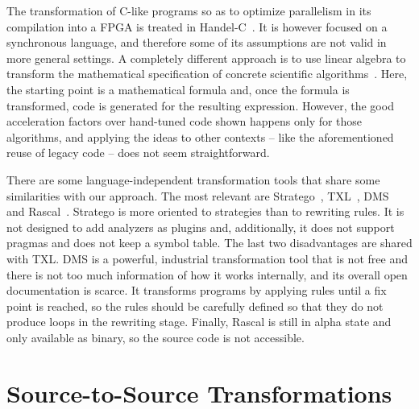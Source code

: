 \documentclass[svgnames,usenames,preprint,nocopyrightspace]{sigplanconf}
\begin{document}
The transformation of C-like programs so as to optimize parallelism in
its compilation into a FPGA is treated in
Handel-C~\cite{Brown2005-tr-opt_trans_hw}.  It is however focused on a
synchronous language, and therefore some of its assumptions are not
valid in more general settings.
A completely different approach is to use linear algebra to transform the
mathematical specification of concrete scientific
algorithms~\cite{Franchetti2006,Fabregat2013,DiNapoli2014}.
Here, the starting point is a mathematical formula and, once the formula is
transformed, code is generated for the resulting expression. 
However, the good acceleration factors over hand-tuned code shown
happens only for those algorithms, and applying the ideas to
other contexts -- like the aforementioned reuse of legacy code --
 does not seem straightforward.




There are some language-independent transformation tools that share
some similarities with our approach. The most relevant are Stratego~\cite{visser04:stratego-XT-0.9}, TXL~\cite{Cordy2006txl}, DMS~\cite{baxter2004dms} and Rascal~\cite{klint2009rascal}. Stratego is
more oriented to strategies than to rewriting rules.  It is not
designed to add analyzers as plugins and,  additionally, it does not support
pragmas and does not keep a symbol table. The last two disadvantages are
shared with TXL. DMS is a powerful,  industrial transformation tool that is not
free and there is not too much information of how it works internally,
and its overall open documentation is scarce. It transforms programs
by applying rules until a fix point is reached, so the rules should be
carefully defined so that they do not produce loops in the rewriting
stage.  Finally, Rascal is still in alpha state and only available as
binary, so the source code is not accessible. 











  

















\section{Source-to-Source Transformations}
\label{sec:s2stransformation}
\end{document}
